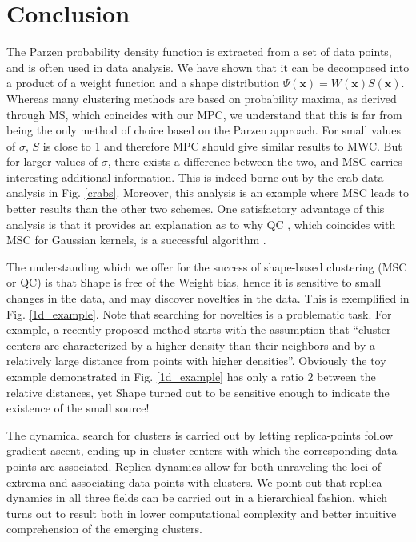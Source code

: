 \documentclass[preprint,12pt]{elsarticle}
\begin{document}
\section{Conclusion}
\label{conclusion}
The Parzen probability density function is extracted from a set of data points, and is often used in data analysis. We have shown that it can be decomposed into a product of a weight function and a shape distribution $\Psi\left(\mathbf{x}\right)=W\left(\mathbf{x}\right)S\left(\mathbf{x}\right)$. Whereas many clustering methods are based on probability maxima, as derived through MS, which coincides with our MPC, we understand that this is far from being the only method of choice based on the Parzen approach. For small values of $\sigma$, $S$ is close to $1$ and therefore MPC should give similar results to MWC. But for larger values of $\sigma$, there exists a difference between the two, and MSC carries interesting additional information. This is indeed borne out by the crab data analysis in Fig. \ref{crabs}. Moreover, this analysis is an example where MSC leads to better results than the other two schemes. One satisfactory advantage of this analysis is that it provides an explanation as to why QC \cite{horn2001}, which coincides with MSC for Gaussian kernels, is a successful algorithm \cite{scott2017data,cui2016analog,liu2016analyzing}.

The understanding which we offer for the success of shape-based clustering (MSC or QC) is that Shape is free of the Weight bias, hence it is sensitive to small changes in the data, and may discover novelties in the data. This is exemplified in Fig. \ref{1d_example}. Note that searching for novelties is a problematic task. For example, a recently proposed method \cite{rodriguez2014clustering} starts with the assumption that ``cluster centers are characterized by a higher density than their neighbors and by a relatively large distance from points with higher densities''. Obviously the toy example demonstrated in Fig. \ref{1d_example} has only a ratio $2$ between the relative distances, yet Shape turned out to be sensitive enough to indicate the existence of the small source!

The dynamical search for clusters is carried out by letting replica-points follow gradient ascent, ending up in cluster centers with which the corresponding data-points are associated. Replica dynamics allow for both unraveling the loci of extrema and associating data points with clusters. We point out that replica dynamics in all three fields can be carried out in a hierarchical fashion, which turns out to result both in lower computational complexity and better intuitive comprehension of the emerging clusters.
\end{document}

